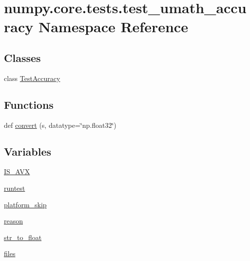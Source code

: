\hypertarget{namespacenumpy_1_1core_1_1tests_1_1test__umath__accuracy}{}\section{numpy.\+core.\+tests.\+test\+\_\+umath\+\_\+accuracy Namespace Reference}
\label{namespacenumpy_1_1core_1_1tests_1_1test__umath__accuracy}
\subsection*{Classes}
\begin{DoxyCompactItemize}
\item 
class \hyperlink{classnumpy_1_1core_1_1tests_1_1test__umath__accuracy_1_1TestAccuracy}{Test\+Accuracy}
\end{DoxyCompactItemize}
\subsection*{Functions}
\begin{DoxyCompactItemize}
\item 
def \hyperlink{namespacenumpy_1_1core_1_1tests_1_1test__umath__accuracy_abf1d23fa89f1e5388877b91c05b4d543}{convert} (s, datatype=\char`\"{}np.\+float32\char`\"{})
\end{DoxyCompactItemize}
\subsection*{Variables}
\begin{DoxyCompactItemize}
\item 
\hyperlink{namespacenumpy_1_1core_1_1tests_1_1test__umath__accuracy_ac7f31d2daefb535b5fe2e7f0eccfc574}{I\+S\+\_\+\+A\+VX}
\item 
\hyperlink{namespacenumpy_1_1core_1_1tests_1_1test__umath__accuracy_ad6188c74f02cc4de587211f5aafe586f}{runtest}
\item 
\hyperlink{namespacenumpy_1_1core_1_1tests_1_1test__umath__accuracy_a1a908cf6969b756e09639880cfe1b0d7}{platform\+\_\+skip}
\item 
\hyperlink{namespacenumpy_1_1core_1_1tests_1_1test__umath__accuracy_abcbdc1fec9fa9909e3b1fe73bdd8c601}{reason}
\item 
\hyperlink{namespacenumpy_1_1core_1_1tests_1_1test__umath__accuracy_ad7c670e461c54aa00cbe5ce158b4e0d2}{str\+\_\+to\+\_\+float}
\item 
\hyperlink{namespacenumpy_1_1core_1_1tests_1_1test__umath__accuracy_a59578794db09373db1228cb5a181c27a}{files}
\end{DoxyCompactItemize}


